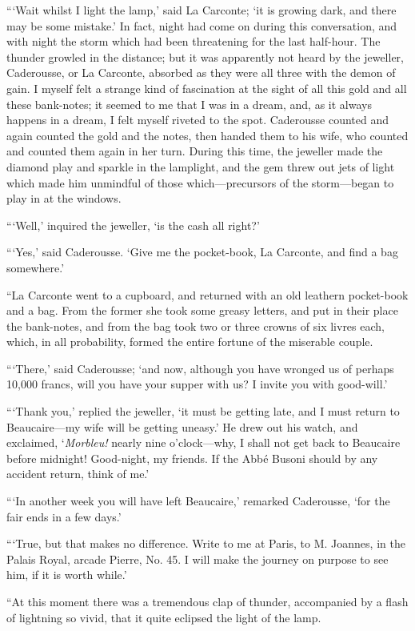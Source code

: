 “‘Wait whilst I light the lamp,’ said La Carconte; ‘it is growing dark,
and there may be some mistake.’ In fact, night had come on during this
conversation, and with night the storm which had been threatening for
the last half-hour. The thunder growled in the distance; but it was
apparently not heard by the jeweller, Caderousse, or La Carconte,
absorbed as they were all three with the demon of gain. I myself felt
a strange kind of fascination at the sight of all this gold and all
these bank-notes; it seemed to me that I was in a dream, and, as it
always happens in a dream, I felt myself riveted to the spot.
Caderousse counted and again counted the gold and the notes, then
handed them to his wife, who counted and counted them again in her
turn. During this time, the jeweller made the diamond play and sparkle
in the lamplight, and the gem threw out jets of light which made him
unmindful of those which—precursors of the storm—began to play in at
the windows.

“‘Well,’ inquired the jeweller, ‘is the cash all right?’

“‘Yes,’ said Caderousse. ‘Give me the pocket-book, La Carconte, and
find a bag somewhere.’

“La Carconte went to a cupboard, and returned with an old leathern
pocket-book and a bag. From the former she took some greasy letters,
and put in their place the bank-notes, and from the bag took two or
three crowns of six livres each, which, in all probability, formed the
entire fortune of the miserable couple.

“‘There,’ said Caderousse; ‘and now, although you have wronged us of
perhaps 10,000 francs, will you have your supper with us? I invite you
with good-will.’

“‘Thank you,’ replied the jeweller, ‘it must be getting late, and I
must return to Beaucaire—my wife will be getting uneasy.’ He drew out
his watch, and exclaimed, ‘\textit{Morbleu!} nearly nine o’clock—why, I shall
not get back to Beaucaire before midnight! Good-night, my friends. If
the Abbé Busoni should by any accident return, think of me.’

“‘In another week you will have left Beaucaire,’ remarked Caderousse,
‘for the fair ends in a few days.’

“‘True, but that makes no difference. Write to me at Paris, to M.
Joannes, in the Palais Royal, arcade Pierre, No. 45. I will make the
journey on purpose to see him, if it is worth while.’

“At this moment there was a tremendous clap of thunder, accompanied by
a flash of lightning so vivid, that it quite eclipsed the light of the
lamp.

